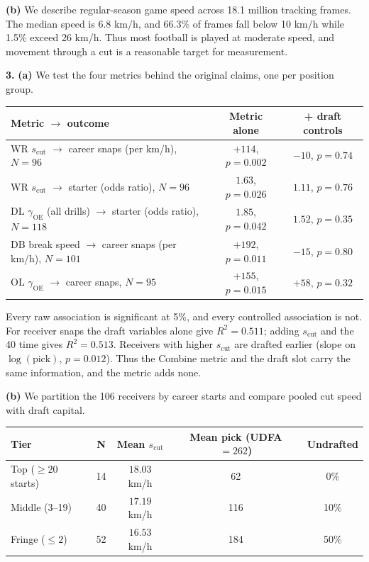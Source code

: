 \documentclass[11pt]{article}
\begin{document}
\noindent\textbf{(b)}
We describe regular-season game speed across 18.1 million tracking frames. The median speed is 6.8 km/h, and 66.3\% of frames fall below 10 km/h while 1.5\% exceed 26 km/h. Thus most football is played at moderate speed, and movement through a cut is a reasonable target for measurement.

\newpage

\noindent\textbf{3.}
\noindent\textbf{(a)}
We test the four metrics behind the original claims, one per position group.

\begin{center}
\small
\begin{tabular}{lcc}
\toprule
\textbf{Metric $\to$ outcome} & \textbf{Metric alone} & \textbf{+ draft controls} \\
\midrule
WR $s_{\text{cut}}$ $\to$ career snaps (per km/h), $N=96$ & $+114$, $p = 0.002$ & $-10$, $p = 0.74$ \\
WR $s_{\text{cut}}$ $\to$ starter (odds ratio), $N=96$ & $1.63$, $p = 0.026$ & $1.11$, $p = 0.76$ \\
DL $\gamma_{\text{OE}}$ (all drills) $\to$ starter (odds ratio), $N=118$ & $1.85$, $p = 0.042$ & $1.52$, $p = 0.35$ \\
DB break speed $\to$ career snaps (per km/h), $N=101$ & $+192$, $p = 0.011$ & $-15$, $p = 0.80$ \\
OL $\gamma_{\text{OE}}$ $\to$ career snaps, $N=95$ & $+155$, $p = 0.015$ & $+58$, $p = 0.32$ \\
\bottomrule
\end{tabular}
\end{center}

Every raw association is significant at 5\%, and every controlled association is not. For receiver snaps the draft variables alone give $R^2 = 0.511$; adding $s_{\text{cut}}$ and the 40 time gives $R^2 = 0.513$. Receivers with higher $s_{\text{cut}}$ are drafted earlier (slope on $\log(\text{pick})$, $p = 0.012$). Thus the Combine metric and the draft slot carry the same information, and the metric adds none.

\noindent\textbf{(b)}
We partition the 106 receivers by career starts and compare pooled cut speed with draft capital.

\begin{center}
\small
\begin{tabular}{lcccc}
\toprule
\textbf{Tier} & \textbf{N} & \textbf{Mean $s_{\text{cut}}$} & \textbf{Mean pick (UDFA $=262$)} & \textbf{Undrafted} \\
\midrule
Top ($\ge 20$ starts) & 14 & $18.03$ km/h & 62 & 0\% \\
Middle (3--19) & 40 & $17.19$ km/h & 116 & 10\% \\
Fringe ($\le 2$) & 52 & $16.53$ km/h & 184 & 50\% \\
\bottomrule
\end{tabular}
\end{center}
\end{document}
